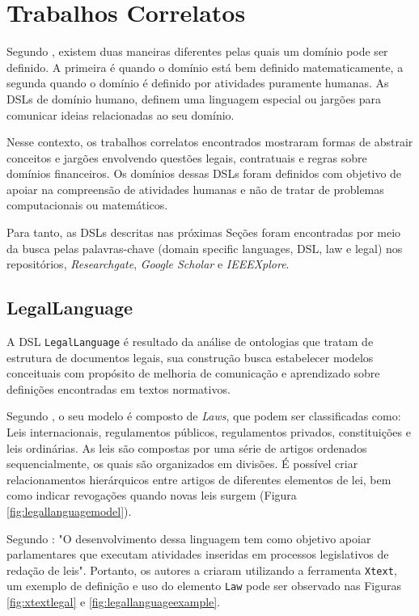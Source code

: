 \section{Trabalhos Correlatos}
\label{subsection:trabalhoscorrelatos}
 Segundo , existem duas maneiras diferentes pelas quais um domínio pode ser definido. A primeira é quando o domínio está bem definido matematicamente, a segunda quando o domínio é definido por atividades puramente humanas. As DSLs de domínio humano, definem uma linguagem especial ou jargões para comunicar ideias relacionadas ao seu domínio.  
 
 Nesse contexto, os trabalhos correlatos encontrados mostraram formas de abstrair conceitos e jargões envolvendo questões legais, contratuais e regras sobre domínios financeiros. Os domínios dessas DSLs foram definidos com objetivo de apoiar na compreensão de atividades humanas e não de tratar de problemas computacionais ou matemáticos.
 
 Para tanto, as DSLs descritas nas próximas Seções foram encontradas por meio da busca pelas palavras-chave (domain specific languages, DSL, law e legal)  nos repositórios, \textit{Researchgate}, \textit{Google Scholar} e \textit{IEEEXplore}.
 
 
\subsection{LegalLanguage}
\label{legallanguage}

A DSL \texttt{LegalLanguage} é resultado da análise de ontologias que tratam de estrutura de documentos legais, sua construção busca estabelecer modelos conceituais com propósito de melhoria de comunicação e aprendizado sobre definições encontradas em textos normativos.



Segundo , o seu modelo é composto de \textit{Laws}, que podem ser classificadas como: Leis internacionais, regulamentos públicos, regulamentos privados, constituições e leis ordinárias. As leis são compostas por uma série de artigos ordenados sequencialmente, os quais são organizados em divisões. É possível criar relacionamentos hierárquicos entre artigos de diferentes elementos de lei, bem como indicar revogações quando novas leis surgem (Figura \ref{fig:legallanguagemodel}). 

Segundo : "O desenvolvimento dessa linguagem tem como objetivo apoiar parlamentares que executam atividades inseridas em processos legislativos de redação de leis". Portanto, os autores a criaram utilizando a ferramenta \texttt{Xtext}, um exemplo de definição e uso do elemento \texttt{Law} pode ser observado nas Figuras \ref{fig:xtextlegal} e \ref{fig:legallanguageexample}.

